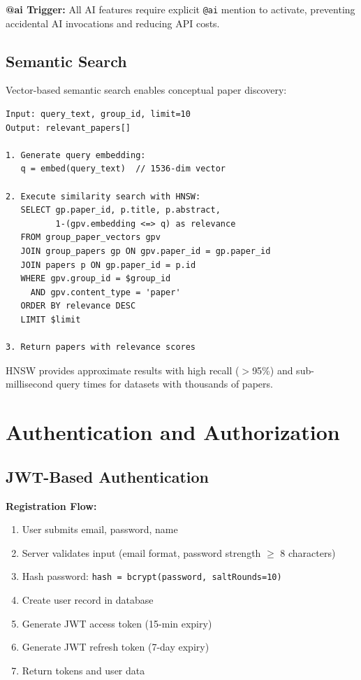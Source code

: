 \documentclass[12pt]{report}
\begin{document}
\textbf{@ai Trigger:} All AI features require explicit \texttt{@ai} mention to activate, preventing accidental AI invocations and reducing API costs.

\subsection{Semantic Search}

Vector-based semantic search enables conceptual paper discovery:

\begin{verbatim}
Input: query_text, group_id, limit=10
Output: relevant_papers[]

1. Generate query embedding:
   q = embed(query_text)  // 1536-dim vector
   
2. Execute similarity search with HNSW:
   SELECT gp.paper_id, p.title, p.abstract,
          1-(gpv.embedding <=> q) as relevance
   FROM group_paper_vectors gpv
   JOIN group_papers gp ON gpv.paper_id = gp.paper_id
   JOIN papers p ON gp.paper_id = p.id
   WHERE gpv.group_id = $group_id
     AND gpv.content_type = 'paper'
   ORDER BY relevance DESC
   LIMIT $limit
   
3. Return papers with relevance scores
\end{verbatim}

HNSW provides approximate results with high recall ($>$95\%) and sub-millisecond query times for datasets with thousands of papers.

\section{Authentication and Authorization}

\subsection{JWT-Based Authentication}

\textbf{Registration Flow:}
\begin{enumerate}
    \item User submits email, password, name
    \item Server validates input (email format, password strength $\geq$ 8 characters)
    \item Hash password: \texttt{hash = bcrypt(password, saltRounds=10)}
    \item Create user record in database
    \item Generate JWT access token (15-min expiry)
    \item Generate JWT refresh token (7-day expiry)
    \item Return tokens and user data
\end{enumerate}
\end{document}
